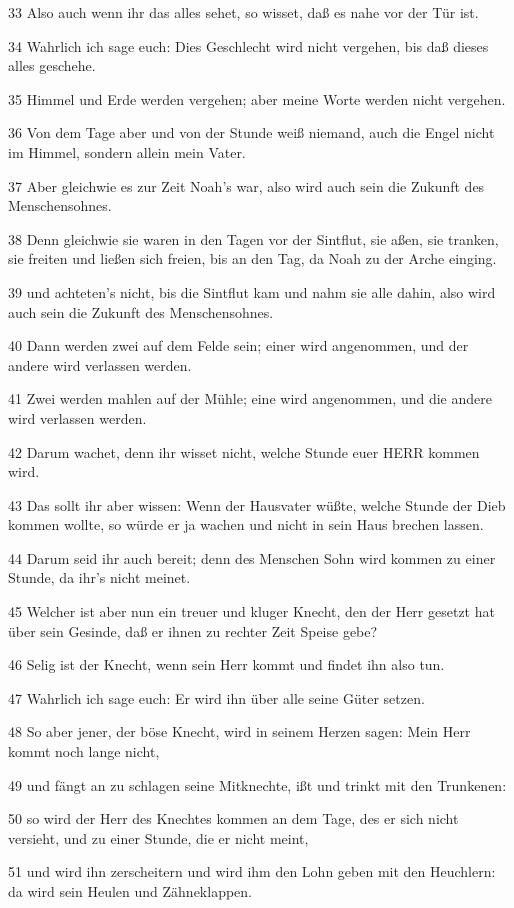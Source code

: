 \par 33 Also auch wenn ihr das alles sehet, so wisset, daß es nahe vor der Tür ist.
\par 34 Wahrlich ich sage euch: Dies Geschlecht wird nicht vergehen, bis daß dieses alles geschehe.
\par 35 Himmel und Erde werden vergehen; aber meine Worte werden nicht vergehen.
\par 36 Von dem Tage aber und von der Stunde weiß niemand, auch die Engel nicht im Himmel, sondern allein mein Vater.
\par 37 Aber gleichwie es zur Zeit Noah's war, also wird auch sein die Zukunft des Menschensohnes.
\par 38 Denn gleichwie sie waren in den Tagen vor der Sintflut, sie aßen, sie tranken, sie freiten und ließen sich freien, bis an den Tag, da Noah zu der Arche einging.
\par 39 und achteten's nicht, bis die Sintflut kam und nahm sie alle dahin, also wird auch sein die Zukunft des Menschensohnes.
\par 40 Dann werden zwei auf dem Felde sein; einer wird angenommen, und der andere wird verlassen werden.
\par 41 Zwei werden mahlen auf der Mühle; eine wird angenommen, und die andere wird verlassen werden.
\par 42 Darum wachet, denn ihr wisset nicht, welche Stunde euer HERR kommen wird.
\par 43 Das sollt ihr aber wissen: Wenn der Hausvater wüßte, welche Stunde der Dieb kommen wollte, so würde er ja wachen und nicht in sein Haus brechen lassen.
\par 44 Darum seid ihr auch bereit; denn des Menschen Sohn wird kommen zu einer Stunde, da ihr's nicht meinet.
\par 45 Welcher ist aber nun ein treuer und kluger Knecht, den der Herr gesetzt hat über sein Gesinde, daß er ihnen zu rechter Zeit Speise gebe?
\par 46 Selig ist der Knecht, wenn sein Herr kommt und findet ihn also tun.
\par 47 Wahrlich ich sage euch: Er wird ihn über alle seine Güter setzen.
\par 48 So aber jener, der böse Knecht, wird in seinem Herzen sagen: Mein Herr kommt noch lange nicht,
\par 49 und fängt an zu schlagen seine Mitknechte, ißt und trinkt mit den Trunkenen:
\par 50 so wird der Herr des Knechtes kommen an dem Tage, des er sich nicht versieht, und zu einer Stunde, die er nicht meint,
\par 51 und wird ihn zerscheitern und wird ihm den Lohn geben mit den Heuchlern: da wird sein Heulen und Zähneklappen.

